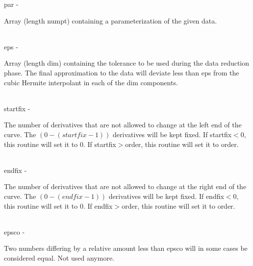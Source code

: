         \>\>    {\fov par}      \> - \> \begin{minipg2}
                                Array (length numpt) containing a
                                parameterization of the given data.
                                \end{minipg2}\\[0.3ex]
        \>\>    {\fov eps}      \> - \> \begin{minipg2}
                                Array (length dim) containing the tolerance to be
                                used during the data reduction phase. The final
                                approximation to the data will deviate less than
                                eps from the cubic Hermite interpolant in each
                                of the dim components.
                                \end{minipg2}\\[0.3ex]
        \>\>    {\fov startfix}\> - \>  \begin{minipg2}
                                The number of derivatives that are not allowed to
                                change at the left end of the curve.
                                The $(0 - (startfix -1))$
                                derivatives will be kept fixed. If startfix$<$0, this
                                routine will set it to 0. If startfix$>$order,
                                this routine will set it to order.
                                \end{minipg2}\\[0.3ex]
        \>\>    {\fov endfix}   \> - \> \begin{minipg2}
                                The number of derivatives that are not allowed to
                                change at the right end of the curve.
                                The $(0 - (endfix-1))$ derivatives will
                                be kept fixed.
                                If endfix$<$0, this routine will set it to 0.
                                If endfix$>$order, this routine will
                                set it to order.
                                \end{minipg2}\\[0.8ex]
        \>\>    {\fov epsco}    \> - \> \begin{minipg2}
                                Two numbers differing by a relative amount less
                                than epsco will in some cases be
                                considered equal.
                                Not used anymore.
                                \end{minipg2}\\[0.3ex]
